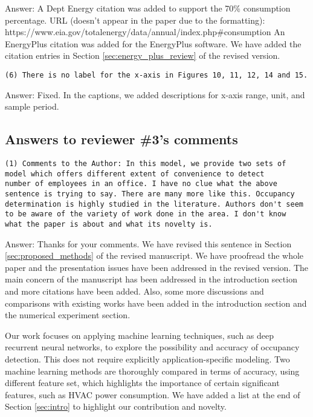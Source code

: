 Answer: A Dept Energy citation was added to support the 70\% consumption
percentage.  URL (doesn't appear in the paper due to the formatting):
https://www.eia.gov/totalenergy/data/annual/index.php\#consumption An
EnergyPlus citation was added for the EnergyPlus software. We have added the
citation entries in Section \ref{sec:energy_plus_review} of the revised version.

\begin{verbatim}
(6) There is no label for the x-axis in Figures 10, 11, 12, 14 and 15.
\end{verbatim}

Answer: Fixed. In the captions, we added descriptions for x-axis range, unit, and
sample period.

\subsection{Answers to reviewer \#3's comments}
\begin{verbatim}
(1) Comments to the Author: In this model, we provide two sets of
model which offers different extent of convenience to detect
number of employees in an office. I have no clue what the above
sentence is trying to say. There are many more like this. Occupancy
determination is highly studied in the literature. Authors don't seem
to be aware of the variety of work done in the area. I don't know
what the paper is about and what its novelty is.
\end{verbatim}

Answer: Thanks for your comments. We have revised this sentence in
Section \ref{sec:proposed_methods} of the revised manuscript. We have
proofread the whole paper and the presentation issues have been
addressed in the revised version. The main concern of the manuscript
has been addressed in the introduction section and more citations have
been added. Also, some more discussions and comparisons with
existing works have been added in the introduction section and the
numerical experiment section.

Our work focuses on applying machine learning techniques, such as deep
recurrent neural networks, to explore the possibility and accuracy of
occupancy detection. This does not require explicitly
application-specific modeling.  Two machine learning methods are
thoroughly compared in terms of accuracy, using different feature set,
which highlights the importance of certain significant features, such
as HVAC power consumption. We have added a list at the end of Section
\ref{sec:intro} to highlight our contribution and novelty.

